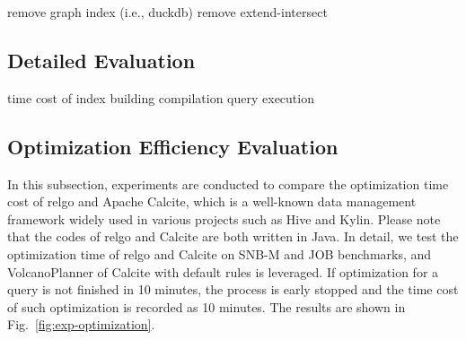 remove graph index (i.e., duckdb)
remove extend-intersect


\subsection{Detailed Evaluation}
\label{sec:experiment-detail}

time cost of index building
compilation
query execution

\subsection{Optimization Efficiency Evaluation}
\label{sec:experiment-optimize}

In this subsection, experiments are conducted to compare the optimization time cost of relgo and Apache Calcite, which is a well-known data management framework widely used in various projects such as Hive and Kylin.
Please note that the codes of relgo and Calcite are both written in Java.
In detail, we test the optimization time of relgo and Calcite on SNB-M and JOB benchmarks, and VolcanoPlanner of Calcite with default rules is leveraged.
If optimization for a query is not finished in 10 minutes, the process is early stopped and the time cost of such optimization is recorded as 10 minutes.
The results are shown in Fig.~\ref{fig:exp-optimization}.

